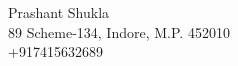 \documentclass[12pt]{article}
\begin{document}
\begin{center}
    {\Huge \schape Prashant Shukla} \\ \vspace{5pt}
    89 Scheme-134, Indore, M.P. 452010 \\ \vspace{3pt}
    \small  +917415632689
\end{center}
\end{document}
